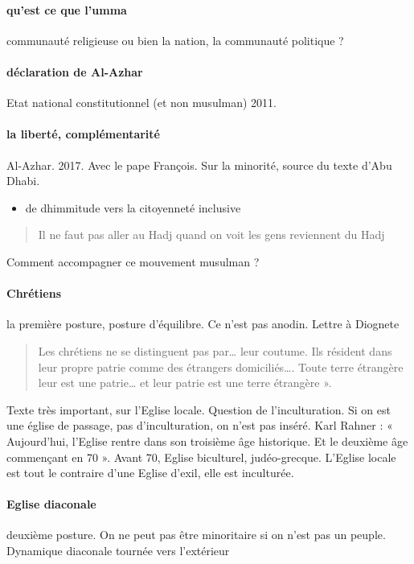 \paragraph{qu’est ce que l’umma} communauté religieuse ou bien la nation, la communauté politique ?

\paragraph{déclaration de Al-Azhar} Etat national constitutionnel (et non musulman) 2011. 
\paragraph{la liberté, complémentarité} Al-Azhar. 2017. Avec le pape François. Sur la minorité, source du texte d’Abu Dhabi. 

\begin{itemize}
\item de dhimmitude vers la citoyenneté inclusive
\end{itemize}
\begin{quote}
Il ne faut pas aller au Hadj quand on voit les gens reviennent du Hadj
\end{quote}
Comment accompagner ce mouvement musulman ? 

\paragraph{Chrétiens} la première posture, posture d’équilibre. Ce n’est pas anodin. 
Lettre à Diognete
\begin{quote}
Les chrétiens ne se distinguent pas par… leur coutume. Ils résident dans leur propre patrie comme des étrangers domiciliés…. Toute terre étrangère leur est une patrie… et leur patrie est une terre étrangère ».
\end{quote}
Texte très important, sur l’Eglise locale. Question de l’inculturation. Si on est une église de passage, pas d’inculturation, on n’est pas inséré. Karl Rahner : « Aujourd’hui, l’Eglise rentre dans son troisième âge historique.  Et le deuxième âge commençant en 70 ». Avant 70, Eglise biculturel, judéo-grecque.
L’Eglise locale est tout le contraire d’une Eglise d’exil, elle est inculturée. 

\paragraph{Eglise diaconale} deuxième posture. On ne peut pas être minoritaire si on n’est pas un peuple. Dynamique diaconale tournée vers l’extérieur

